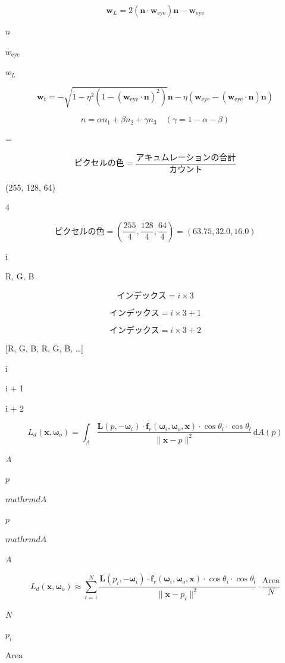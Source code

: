 \documentclass{article}
\begin{document}
\[
\mathbf{w}_L = 2 (\mathbf{n} \cdot \mathbf{w}_\text{eye}) \mathbf{n} - \mathbf{w}_\text{eye}
\]
\pagebreak

${n}$
\pagebreak

${w}_\text{eye}$
\pagebreak

${w}_L$
\pagebreak

\[
  \mathbf{w}_t = -\sqrt{1 - \eta^2 (1 - (\mathbf{w}_\text{eye} \cdot \mathbf{n})^2)} \mathbf{n} - \eta (\mathbf{w}_\text{eye} - (\mathbf{w}_\text{eye} \cdot \mathbf{n}) \mathbf{n})
  \]
\pagebreak

\[
n = \alpha n_1 + \beta n_2 + \gamma n_3 \quad (\gamma = 1 - \alpha - \beta)
\]
\pagebreak

  =  
\pagebreak

\[
\text{ピクセルの色} = \frac{\text{アキュムレーションの合計}}{\text{カウント}}
\]
\pagebreak

 (255, 128, 64) 
\pagebreak

 4 
\pagebreak

\[
\text{ピクセルの色} = \left( \frac{255}{4}, \frac{128}{4}, \frac{64}{4} \right) = (63.75, 32.0, 16.0)
\]
\pagebreak

 i 
\pagebreak

 R, G, B 
\pagebreak

\[
  \text{インデックス} = i \times 3
  \]
\pagebreak

\[
  \text{インデックス} = i \times 3 + 1
  \]
\pagebreak

\[
  \text{インデックス} = i \times 3 + 2
  \]
\pagebreak

 [R, G, B, R, G, B, \dots] 
\pagebreak

 i  
\pagebreak

 i  + 1 
\pagebreak

 i  + 2 
\pagebreak

\[
L_d(\mathbf{x}, \mathbf{\omega}_o) = \int_A \frac{\mathbf{L}(p, -\mathbf{\omega}_i) \cdot \mathbf{f}_r(\mathbf{\omega}_i, \mathbf{\omega}_o, \mathbf{x}) \cdot \cos \theta_i \cdot \cos \theta_l}{\|\mathbf{x} - p\|^2} \, \mathrm{d}A(p)
\]
\pagebreak

$A $
\pagebreak

$ p $
\pagebreak

$mathrm{d}A $
\pagebreak

$p $
\pagebreak

$mathrm{d}A$
\pagebreak

$ A $
\pagebreak

\[
L_d(\mathbf{x}, \mathbf{\omega}_o) \approx \sum_{i=1}^N \frac{\mathbf{L}(p_i, -\mathbf{\omega}_i) \cdot \mathbf{f}_r(\mathbf{\omega}_i, \mathbf{\omega}_o, \mathbf{x}) \cdot \cos \theta_i \cdot \cos \theta_l}{\|\mathbf{x} - p_i\|^2} \cdot \frac{\mathrm{Area}}{N}
\]
\pagebreak

$ N $
\pagebreak

$ p_i $
\pagebreak

$ \mathrm{Area} $
\pagebreak
\end{document}
